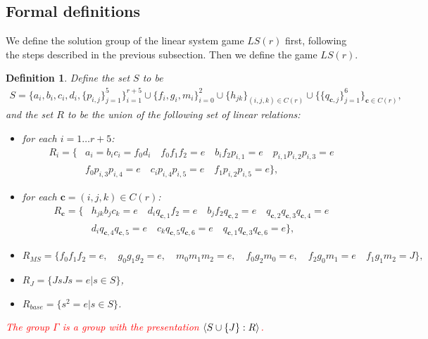\documentclass[11pt,letterpaper]{article}
\DeclarePairedDelimiter{\ip}{\langle}{\rangle}
\newcommand{\1}{\mathbb{1}}
\newcommand{\LS}{LS}
\newcommand{\bc}{\pmb{c}}
\newcommand{\hf}[1]{\textcolor{red}{#1}}
\newtheorem{definition}[theorem]{Definition}
\theoremstyle{definition}
\begin{document}
\subsection{Formal definitions}
\label{sec:gamma_def}
We define the solution group of the linear system game $\LS(r)$ first, following the steps described in the previous subsection.
Then we define the game $\LS(r)$.
\begin{definition}
\label{def:gamma}
Define the set $S$ to be 
\begin{align*}
	S = \{a_i, b_i, c_i, d_i,\{ p_{i,j} \}_{j=1}^5\}_{i=1}^{r+5} \cup \{f_i,g_i,m_i\}_{i=0}^2 \cup \{h_{jk}\}_{(i,j,k) \in C(r)} \cup 
	\{\{q_{\bc,j} \}_{j=1}^6\}_{\bc \in C(r)},
\end{align*}
and the set $R$ to be the union of the following
set of linear relations:
\begin{itemize}
\item for each $i = 1 \dots r+5$:
\begin{align*}
	R_i =  \{ &a_i = b_ic_i = f_0d_i\quad
	f_0 f_1 f_2 = e \quad b_i f_2 p_{i,1} = e \quad p_{i,1} p_{i,2} p_{i,3} = e\\
	&f_0 p_{i,3} p_{i,4} = e \quad c_i p_{i,4} p_{i,5} =e \quad f_1 p_{i,2} p_{i,5} = e\},
\end{align*}
\item for each $ \bc = (i,j,k) \in C(r)$:
\begin{align*}
	R_{\bc} = \{&h_{jk}b_j c_k = e \quad
	d_i q_{\bc,1} f_2 = e \quad b_j f_2 q_{\bc,2} = e \quad q_{\bc,2} q_{\bc,3} q_{\bc,4} = e\\
	&d_i q_{\bc,4} q_{\bc,5} = e \quad c_k q_{\bc,5} q_{\bc,6} =e \quad q_{\bc,1} q_{\bc,3} q_{\bc,6} = e\},
\end{align*}
\item 
$
	R_{MS} = \{f_0 f_1 f_2 = e,\quad g_0 g_1 g_2 = e,\quad m_0 m_1 m_2 = e,\quad
	f_0 g_2 m_0 = e, \quad f_2 g_0 m_1 = e \quad f_1 g_1 m_2 = J\},
$
\item $R_J = \{ J s J s = e \vert s \in S\}$,
\item $R_{base} = \{ s^2 = e \vert s \in S\}$.
\end{itemize}
\hf{The group $\Gamma$ is a group with the presentation
$\ip{S \cup \{J\} : R}$.}
\end{definition}
\end{document}
